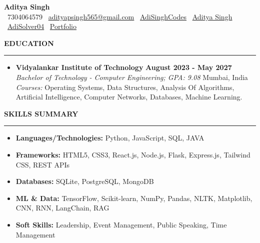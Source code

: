 \documentclass[letterpaper,10pt]{article}
\newcommand{\sectionheader}[1]{%
    \vspace{3pt}
    \noindent\textbf{\large #1}
    \rule{\linewidth}{0.4pt}
    \vspace{-2pt}
}
\begin{document}
\pagestyle{empty}

\begin{center}
    \textbf{\Huge Aditya Singh} \\
    \vspace{1pt}
    \normalsize
    \RaggedRight
    \faPhone \ 7304064579 \hspace*{\fill}
    \faEnvelope \ \href{mailto:adityapsingh565@gmail.com}{adityapsingh565@gmail.com} \hspace*{\fill}
    \faGithub \ \href{https://github.com/AdiSinghCodes}{AdiSinghCodes} \hspace*{\fill}
    \faLinkedin \ \href{https://www.linkedin.com/in/aditya-singh-2b319b299}{Aditya Singh} \hspace*{\fill}
    \faCode \ \href{https://leetcode.com/AdiSolver04}{AdiSolver04} \hspace*{\fill}
    \faGlobe \ \href{https://adisinghcodes.github.io/Portfolio/}{Portfolio}
\end{center}

\sectionheader{EDUCATION}
\begin{itemize}[leftmargin=*,label=\textbullet, noitemsep, topsep=0pt, partopsep=0pt]
    \item \textbf{Vidyalankar Institute of Technology} \hfill \textbf{August 2023 - May 2027} \\
    \textit{Bachelor of Technology - Computer Engineering; GPA: 9.08} \hfill Mumbai, India \\
    \textit{Courses:} Operating Systems, Data Structures, Analysis Of Algorithms, Artificial Intelligence, Computer Networks, Databases, Machine Learning.
\end{itemize}

\sectionheader{SKILLS SUMMARY}
\begin{itemize}[leftmargin=*,label=\textbullet, noitemsep, topsep=0pt, partopsep=0pt]
    \item \textbf{Languages/Technologies:} Python, JavaScript, SQL, JAVA
    \item \textbf{Frameworks:} HTML5, CSS3, React.js, Node.js, Flask, Express.js, Tailwind CSS, REST APIs
    \item \textbf{Databases:} SQLite, PostgreSQL, MongoDB
    \item \textbf{ML \& Data:} TensorFlow, Scikit-learn, NumPy, Pandas, NLTK, Matplotlib, CNN, RNN, LangChain, RAG
    \item \textbf{Soft Skills:} Leadership, Event Management, Public Speaking, Time Management
\end{itemize}
\end{document}
